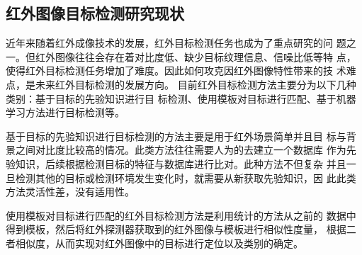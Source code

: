 \subsection{红外图像目标检测研究现状}
近年来随着红外成像技术的发展，红外目标检测任务也成为了重点研究的问
题之一。但红外图像往往会存在着对比度低、缺少目标纹理信息、信噪比低等特
点，使得红外目标检测任务增加了难度。因此如何攻克因红外图像特性带来的技
术难点，是未来红外目标检测的发展方向\cite{李浩2019基于图像识别的航空发动机叶片裂纹检测研究,蒋志新2019基于深度学习的海上红外小目标检测方法研究}。
目前红外目标检测方法主要分为以下几种类别：基于目标的先验知识进行目
标检测、使用模板对目标进行匹配、基于机器学习方法进行目标检测等\cite{朱大炜2018基于深度学习的红外图像飞机目标检测方法}。

基于目标的先验知识进行目标检测的方法主要是用于红外场景简单并且目
标与背景之间对比度比较高的情况。此类方法往往需要人为的去建立一个数据库
作为先验知识，后续根据检测目标的特征与数据库进行比对。此种方法不但复杂
并且一旦检测其他的目标或检测环境发生变化时，就需要从新获取先验知识，因
此此类方法灵活性差，没有适用性。

使用模板对目标进行匹配的红外目标检测方法是利用统计的方法从之前的
数据中得到模板，然后将红外探测器获取到的红外图像与模板进行相似性度量，
根据二者相似度，从而实现对红外图像中的目标进行定位以及类别的确定\cite{宋曦2010一种基于模板匹配的目标识别方法}。

